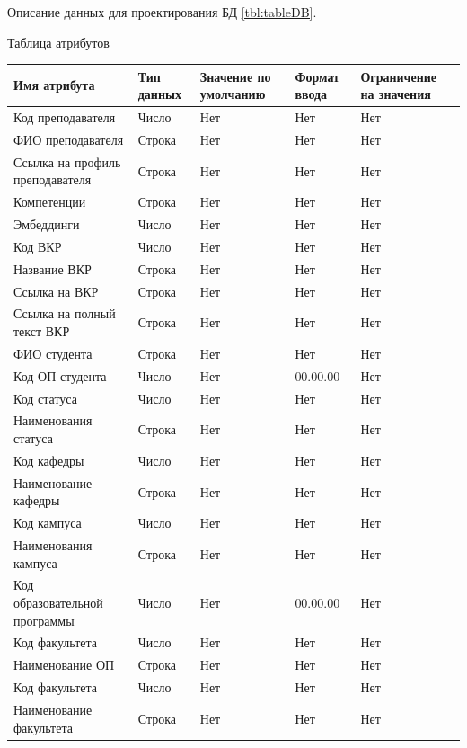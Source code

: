 \documentclass[PI,KR]{HSEUniversity}
\begin{document}
Описание данных для проектирования БД \ref{tbl:tableDB}.
\begin{TABLE}[!h]{Таблица атрибутов \label{tbl:tableDB}}
	\begin{tabular}[c]{|p{4cm}|l|p{3cm}|l|p{3cm}|}
		
		\hline
		Имя атрибута & Тип данных & Значение по умолчанию & Формат ввода & Ограничение на значения\\ \hline

		Код преподавателя 				& Число  & Нет & Нет 		& Нет \\ \hline
		ФИО преподавателя 				& Строка & Нет & Нет 		& Нет \\ \hline	
		Ссылка на профиль преподавателя & Строка & Нет & Нет 		& Нет \\ \hline
		Компетенции 					& Строка & Нет & Нет 		& Нет \\ \hline
		Эмбеддинги 						& Число  & Нет & Нет 		& Нет \\ \hline
		Код ВКР 						& Число  & Нет & Нет 		& Нет \\ \hline
		Название ВКР 					& Строка & Нет & Нет 		& Нет \\ \hline
		Ссылка на ВКР 					& Строка & Нет & Нет 		& Нет \\ \hline
		Ссылка на полный текст ВКР 		& Строка & Нет & Нет 		& Нет \\ \hline
		ФИО студента 					& Строка & Нет & Нет 		& Нет \\ \hline
		Код ОП студента 				& Число  & Нет & 00.00.00	& Нет \\ \hline
		Код статуса 					& Число  & Нет & Нет		& Нет \\ \hline
		Наименования статуса 			& Строка & Нет & Нет 		& Нет \\ \hline
		Код кафедры 					& Число  & Нет & Нет 		& Нет \\ \hline
		Наименование кафедры 			& Строка & Нет & Нет 		& Нет \\ \hline
		Код кампуса 					& Число  & Нет & Нет 		& Нет \\ \hline
		Наименования кампуса 			& Строка & Нет & Нет 		& Нет \\ \hline
		Код образовательной программы 	& Число  & Нет & 00.00.00 	& Нет \\ \hline
		Код факультета		 			& Число  & Нет & Нет 		& Нет \\ \hline
		Наименование ОП 				& Строка & Нет & Нет	 	& Нет \\ \hline
		Код факультета 					& Число  & Нет & Нет 		& Нет \\ \hline
		Наименование факультета 		& Строка & Нет & Нет 		& Нет \\ \hline
	\end{tabular}
\end{TABLE}
\end{document}
